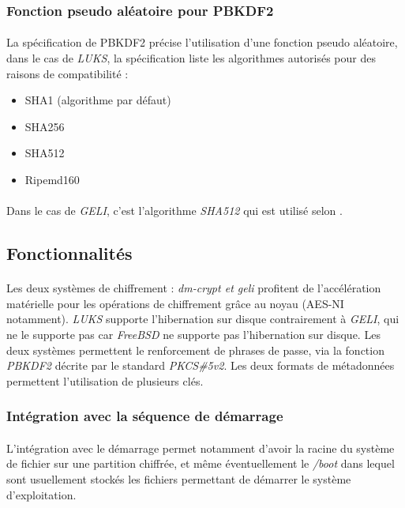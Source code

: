 \subsubsection{Fonction pseudo aléatoire pour PBKDF2}
\paragraph{}
La spécification de PBKDF2 \cite{PKCS5v2} précise l'utilisation d'une fonction
pseudo aléatoire, dans le cas de {\em LUKS}, la spécification 
\cite{onDiskFormatLuks} liste les algorithmes autorisés
pour des raisons de compatibilité :
\begin{itemize}
	\item SHA1 (algorithme par défaut)
	\item SHA256
	\item SHA512
	\item Ripemd160
\end{itemize}
\paragraph{}
Dans le cas de {\em GELI}, c'est l'algorithme {\em SHA512} qui est utilisé
selon \cite{geliPkcs5v2.c}.
\subsection{Fonctionnalités}
\paragraph{}
Les deux systèmes de chiffrement : {\em dm-crypt \em et \em geli} profitent 
de l'accélération matérielle pour les opérations de chiffrement grâce au 
noyau (AES-NI notamment). {\em LUKS} supporte l'hibernation sur disque 
contrairement à {\em GELI}, qui ne le supporte pas car {\em FreeBSD} ne 
supporte pas l'hibernation sur disque. Les deux systèmes permettent le 
renforcement de phrases de passe, via la fonction {\em PBKDF2} décrite 
par le standard {\em PKCS\#5v2}. Les deux formats de métadonnées 
permettent l'utilisation de plusieurs clés.

\subsubsection{Intégration avec la séquence de démarrage}
\paragraph{}
L'intégration avec le démarrage permet notamment d'avoir la racine du système 
de fichier sur une partition chiffrée, et même éventuellement le {\em /boot}
dans lequel sont usuellement stockés les fichiers permettant de démarrer le 
système d'exploitation.


